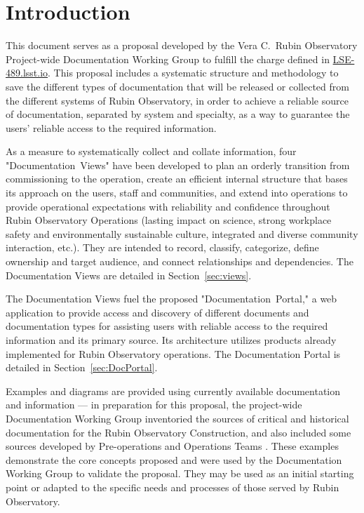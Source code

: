 \section{Introduction}

This document serves as a proposal developed by the Vera C.\ Rubin Observatory Project-wide Documentation Working Group to fulfill the charge defined in \url{LSE-489.lsst.io}.
This proposal includes a systematic structure and methodology to save the different types of documentation that will be released or collected from the different systems of Rubin Observatory,
in order to achieve a reliable source of documentation, separated by system and specialty, as a way to guarantee the users' reliable access to the required information.

As a measure to systematically collect and collate information, four "Documentation~Views" have been developed to
plan an orderly transition from commissioning to the operation,
create an efficient internal structure that bases its approach on the users, staff and communities,
and extend into operations to provide operational expectations with reliability and confidence throughout Rubin Observatory Operations
(lasting impact on science, strong workplace safety and environmentally sustainable culture, integrated and diverse community interaction, etc.).
They are intended to record, classify, categorize, define ownership and target audience, and connect relationships and dependencies.
The Documentation Views are detailed in Section~\ref{sec:views}.

The Documentation Views fuel the proposed "Documentation~Portal," a web application to provide access and discovery of different documents and documentation types
for assisting users with reliable access to the required information and its primary source.
Its architecture utilizes products already implemented for Rubin Observatory operations.
The Documentation Portal is detailed in Section~\ref{sec:DocPortal}.

Examples and diagrams are provided using currently available documentation and information ---
in preparation for this proposal, the project-wide Documentation Working Group inventoried the sources of critical and historical documentation for the Rubin Observatory Construction,
and also included some sources developed by Pre-operations and Operations Teams .
These examples demonstrate the core concepts proposed and were used by the Documentation Working Group to validate the proposal.
They may be used as an initial starting point or adapted to the specific needs and processes of those served by Rubin Observatory.

